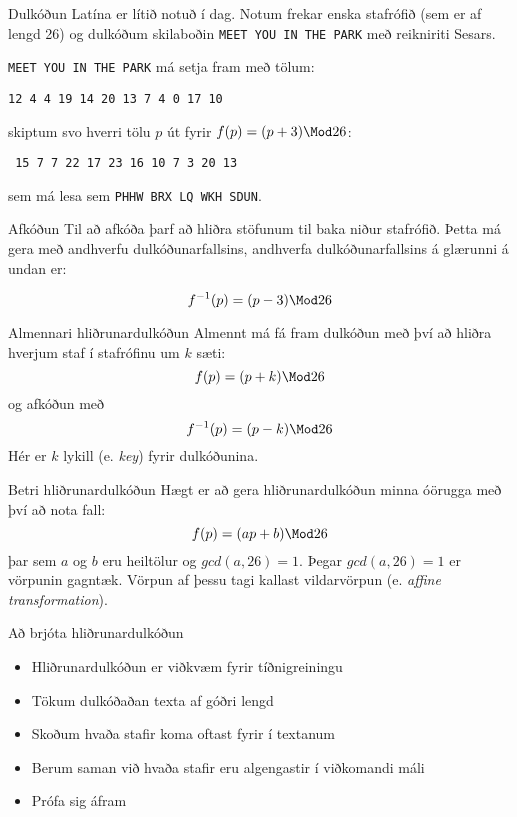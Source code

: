 \documentclass{beamer}
\begin{document}
\begin{frame}{Dulkóðun}
Latína er lítið notuð í dag. Notum frekar enska stafrófið (sem er af lengd 26) og dulkóðum skilaboðin \texttt{MEET YOU IN THE PARK} með reikniriti Sesars. \pause

\texttt{MEET YOU IN THE PARK} má setja fram með tölum:
\begin{center}
\texttt{12 4 4 19 14 20 13 7 4 0 17 10}
\end{center}\pause
skiptum svo hverri tölu $p$ út fyrir $f(p) = (p+3) \Mod 26$:
\begin{center}
\texttt{
15 7 7 22 17 23 16 10 7 3 20 13}
\end{center}
sem má lesa sem \texttt{PHHW BRX LQ WKH SDUN}.
\end{frame}

\begin{frame}{Afkóðun}
Til að afkóða þarf að hliðra stöfunum til baka niður stafrófið. Þetta má gera með andhverfu dulkóðunarfallsins, andhverfa dulkóðunarfallsins á glærunni á undan er:

\[
 f^{-1}(p) = (p-3)\Mod 26
\]
\end{frame}

\begin{frame}{Almennari hliðrunardulkóðun}
Almennt má fá fram dulkóðun með því að hliðra hverjum staf í stafrófinu um $k$ sæti:
\[
 f(p) = (p + k) \Mod 26
\]
og afkóðun með
\[
 f^{-1}(p) = (p - k) \Mod 26
\]
Hér er $k$ lykill (e. \emph{key}) fyrir dulkóðunina.
\end{frame}

\begin{frame}{Betri hliðrunardulkóðun}
Hægt er að gera hliðrunardulkóðun minna óörugga með því að nota fall:
\[
 f(p) = (ap + b)\Mod 26
\]
þar sem $a$ og $b$ eru heiltölur og $gcd(a,26) = 1$. Þegar $gcd(a,26) = 1$ er vörpunin gagntæk. Vörpun af þessu tagi kallast vildarvörpun (e. \emph{affine transformation}).
\end{frame}

\begin{frame}{Að brjóta hliðrunardulkóðun}
\begin{itemize}
 \item Hliðrunardulkóðun er viðkvæm fyrir tíðnigreiningu
 \item Tökum dulkóðaðan texta af góðri lengd
 \item Skoðum hvaða stafir koma oftast fyrir í textanum
 \item Berum saman við hvaða stafir eru algengastir í viðkomandi máli
 \item Prófa sig áfram
\end{itemize}
\end{frame}
\end{document}
